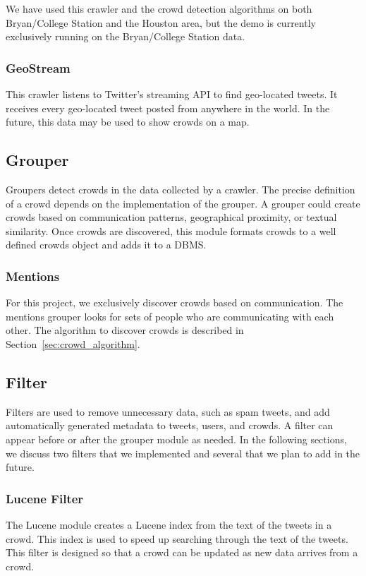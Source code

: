 \documentclass{sig-alternate}
\begin{document}
We have used this crawler and the crowd detection algorithms on both Bryan/College
Station and the Houston area, but the demo is currently exclusively running on the
Bryan/College Station data.

\subsubsection{GeoStream}
This crawler listens to Twitter's
streaming API to find geo-located tweets.  It receives every geo-located tweet
posted from anywhere in the world.  In the future, this data may be used to
show crowds on a map.

\subsection{Grouper}
Groupers detect crowds in the data collected by a crawler.  The precise
definition of a crowd depends on the implementation of the grouper.  A grouper
could create crowds based on communication patterns, geographical proximity, or
textual similarity. Once crowds are discovered, this module formats crowds to a
well defined crowds object and adds it to a DBMS.

\subsubsection{Mentions}
For this project, we exclusively discover crowds based on communication.  The
mentions grouper looks for sets of people who are communicating with each
other.  The algorithm to discover crowds is described in
Section~\ref{sec:crowd_algorithm}.

\subsection{Filter}
Filters are used to remove unnecessary data, such as spam tweets, and add
automatically generated metadata to tweets, users, and crowds.  A filter can
appear before or after the grouper module as needed.  In the following
sections, we discuss two filters that we implemented and several that we plan
to add in the future.

\subsubsection{Lucene Filter}
The Lucene module creates a Lucene index from the text of the tweets in a
crowd.  This index is used to speed up searching through the text of the
tweets. This filter is designed so that a crowd can be updated as new data
arrives from a crowd.
\end{document}
